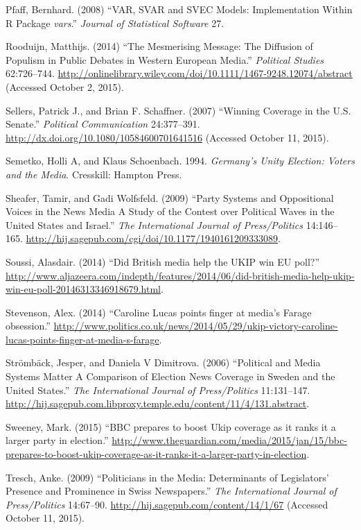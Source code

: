 \documentclass[12pt,article]{article}
\begin{document}
Pfaff, Bernhard. (2008) ``VAR, SVAR and SVEC Models: Implementation
Within R Package \emph{vars}.'' \emph{Journal of Statistical Software}
27.

Rooduijn, Matthijs. (2014) ``The Mesmerising Message: The Diffusion of
Populism in Public Debates in Western European Media.'' \emph{Political
Studies} 62:726--744.
\url{http://onlinelibrary.wiley.com/doi/10.1111/1467-9248.12074/abstract}
(Accessed October 2, 2015).

Sellers, Patrick J., and Brian F. Schaffner. (2007) ``Winning Coverage
in the U.S. Senate.'' \emph{Political Communication} 24:377--391.
\url{http://dx.doi.org/10.1080/10584600701641516} (Accessed October 11,
2015).

Semetko, Holli A, and Klaus Schoenbach. 1994. \emph{Germany's Unity
Election: Voters and the Media}. Cresskill: Hampton Press.

Sheafer, Tamir, and Gadi Wolfsfeld. (2009) ``Party Systems and
Oppositional Voices in the News Media A Study of the Contest over
Political Waves in the United States and Israel.'' \emph{The
International Journal of Press/Politics} 14:146--165.
\url{http://hij.sagepub.com/cgi/doi/10.1177/1940161209333089}.

Soussi, Alasdair. (2014) ``Did British media help the UKIP win EU
poll?''
\url{http://www.aljazeera.com/indepth/features/2014/06/did-british-media-help-ukip-win-eu-poll-20146313346918679.html}.

Stevenson, Alex. (2014) ``Caroline Lucas points finger at media's Farage
obsession.''
\url{http://www.politics.co.uk/news/2014/05/29/ukip-victory-caroline-lucas-points-finger-at-media-s-farage}.

Str{ö}mb{ä}ck, Jesper, and Daniela V Dimitrova. (2006) ``Political and
Media Systems Matter A Comparison of Election News Coverage in Sweden
and the United States.'' \emph{The International Journal of
Press/Politics} 11:131--147.
\url{http://hij.sagepub.com.libproxy.temple.edu/content/11/4/131.abstract}.

Sweeney, Mark. (2015) ``BBC prepares to boost Ukip coverage as it ranks
it a larger party in election.''
\url{http://www.theguardian.com/media/2015/jan/15/bbc-prepares-to-boost-ukip-coverage-as-it-ranks-it-a-larger-party-in-election}.

Tresch, Anke. (2009) ``Politicians in the Media: Determinants of
Legislators' Presence and Prominence in Swiss Newspapers.'' \emph{The
International Journal of Press/Politics} 14:67--90.
\url{http://hij.sagepub.com/content/14/1/67} (Accessed October 11,
2015).
\end{document}
